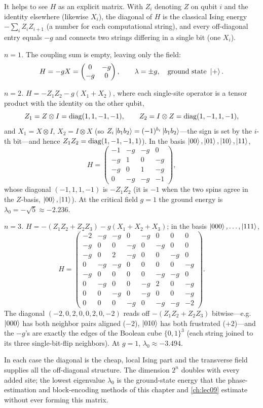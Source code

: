 \begin{remark}[The Ising Hamiltonian written out for $n=1,2,3$]
\label{rem:lec05-tfim-small}
It helps to see $H$ as an explicit matrix. With $Z_i$ denoting $Z$ on qubit $i$ and
the identity elsewhere (likewise $X_i$), the diagonal of $H$ is the classical Ising
energy $-\sum_i Z_iZ_{i+1}$ (a number for each computational string), and every
off-diagonal entry equals $-g$ and connects two strings differing in a single bit
(one $X_i$).

\emph{$n=1$.} The coupling sum is empty, leaving only the field:
\[
  H=-gX=\begin{pmatrix}0&-g\\-g&0\end{pmatrix},
  \qquad \lambda=\pm g,\quad \text{ground state }\ket{+}.
\]

\emph{$n=2$.} $H=-Z_1Z_2-g(X_1+X_2)$, where each single-site operator is a tensor
product with the identity on the other qubit,
\[
  Z_1=Z\otimes I=\operatorname{diag}(1,1,-1,-1),\qquad Z_2=I\otimes Z=\operatorname{diag}(1,-1,1,-1),
\]
and $X_1=X\otimes I$, $X_2=I\otimes X$ (so $Z_i\ket{b_1b_2}=(-1)^{b_i}\ket{b_1b_2}$---the
sign is set by the $i$-th bit---and hence $Z_1Z_2=\operatorname{diag}(1,-1,-1,1)$). In the basis
$\ket{00},\ket{01},\ket{10},\ket{11}$,
\[
  H=\begin{pmatrix}-1&-g&-g&0\\ -g&1&0&-g\\ -g&0&1&-g\\ 0&-g&-g&-1\end{pmatrix},
\]
whose diagonal $(-1,1,1,-1)$ is $-Z_1Z_2$ (it is $-1$ when the two spins agree in the
$Z$-basis, $\ket{00},\ket{11}$). At the critical field $g=1$ the ground energy is
$\lambda_0=-\sqrt5\approx-2.236$.

\emph{$n=3$.} $H=-(Z_1Z_2+Z_2Z_3)-g(X_1+X_2+X_3)$; in the basis
$\ket{000},\dots,\ket{111}$,
\[
  H=\begin{pmatrix}
    -2&-g&-g&0&-g&0&0&0\\
    -g&0&0&-g&0&-g&0&0\\
    -g&0&2&-g&0&0&-g&0\\
    0&-g&-g&0&0&0&0&-g\\
    -g&0&0&0&0&-g&-g&0\\
    0&-g&0&0&-g&2&0&-g\\
    0&0&-g&0&-g&0&0&-g\\
    0&0&0&-g&0&-g&-g&-2
  \end{pmatrix}.
\]
The diagonal $(-2,0,2,0,0,2,0,-2)$ reads off $-(Z_1Z_2+Z_2Z_3)$ bitwise---e.g.\
$\ket{000}$ has both neighbor pairs aligned ($-2$), $\ket{010}$ has both frustrated
($+2$)---and the $-g$'s are exactly the edges of the Boolean cube $\{0,1\}^3$ (each
string joined to its three single-bit-flip neighbors). At $g=1$,
$\lambda_0\approx-3.494$.

In each case the diagonal is the cheap, local Ising part and the transverse field
supplies all the off-diagonal structure. The dimension $2^n$ doubles with every added
site; the lowest eigenvalue $\lambda_0$ is the ground-state energy that the
phase-estimation and block-encoding methods of this chapter and \cref{ch:lec09}
estimate without ever forming this matrix.
\end{remark}

